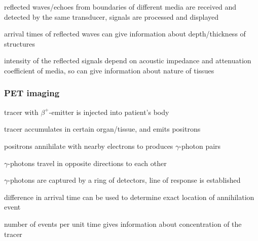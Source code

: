 {reflected waves/echoes from boundaries of different media are received and detected by the same transducer, signals are processed and displayed

arrival times of reflected waves can give information about depth/thickness of structures

intensity of the reflected signals depend on acoustic impedance and attenuation coefficient of media, so can give information about nature of tissues

\subsubsection*{PET imaging}

tracer with $\beta^+$-emitter is injected into patient's body

tracer accumulates in certain organ/tissue, and emits positrons

positrons annihilate with nearby electrons to produces $\gamma$-photon pairs

$\gamma$-photons travel in opposite directions to each other

$\gamma$-photons are captured by a ring of detectors, line of response is established

difference in arrival time can be used to determine exact location of annihilation event

number of events per unit time gives information about concentration of the tracer


%
%
%
%
%
%
%

}
